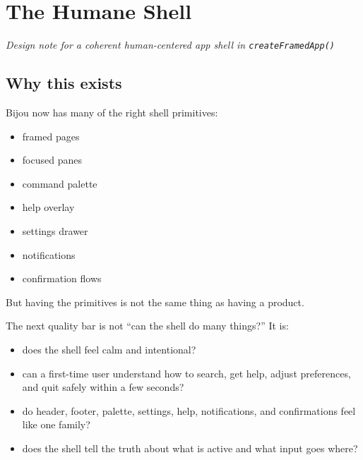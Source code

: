 \chapter{The Humane Shell}\label{record-047}

\smallskip

\emph{Design note for a coherent human-centered app shell in \texttt{c\allowbreak{}r\allowbreak{}e\allowbreak{}a\allowbreak{}t\allowbreak{}e\allowbreak{}F\allowbreak{}r\allowbreak{}a\allowbreak{}m\allowbreak{}e\allowbreak{}d\allowbreak{}A\allowbreak{}p\allowbreak{}p\allowbreak{}(\allowbreak{})}}

\section{Why this exists}\label{record-047-why-this-exists}

Bijou now has many of the right shell primitives:

\begin{itemize}
\tightlist
\item
  framed pages
\item
  focused panes
\item
  command palette
\item
  help overlay
\item
  settings drawer
\item
  notifications
\item
  confirmation flows
\end{itemize}

But having the primitives is not the same thing as having a product.

The next quality bar is not ``can the shell do many things?'' It is:

\begin{itemize}
\tightlist
\item
  does the shell feel calm and intentional?
\item
  can a first-time user understand how to search, get help, adjust preferences, and quit safely within a few seconds?
\item
  do header, footer, palette, settings, help, notifications, and confirmations feel like one family?
\item
  does the shell tell the truth about what is active and what input goes where?
\end{itemize}


